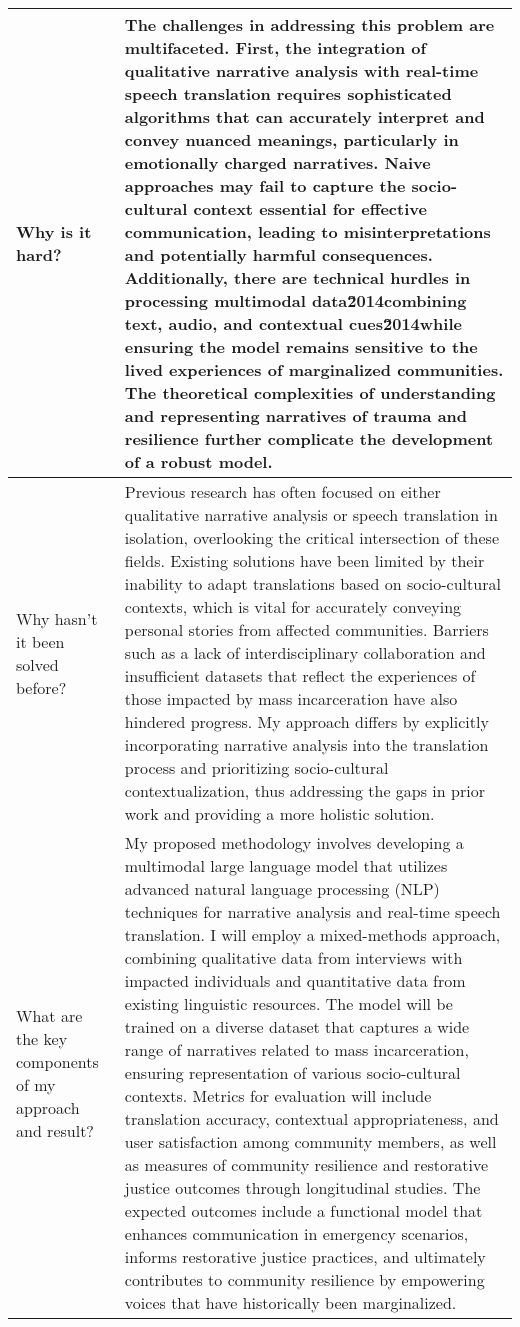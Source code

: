 \begin{table*}[htbp]
\begin{tabular}{p{3.5cm}p{12cm}}
\\ \midrule
Why is it hard? & 
The challenges in addressing this problem are multifaceted. First, the integration of qualitative narrative analysis with real-time speech translation requires sophisticated algorithms that can accurately interpret and convey nuanced meanings, particularly in emotionally charged narratives. Naive approaches may fail to capture the socio-cultural context essential for effective communication, leading to misinterpretations and potentially harmful consequences. Additionally, there are technical hurdles in processing multimodal data\u2014combining text, audio, and contextual cues\u2014while ensuring the model remains sensitive to the lived experiences of marginalized communities. The theoretical complexities of understanding and representing narratives of trauma and resilience further complicate the development of a robust model. \\ \midrule
Why hasn't it been solved before? & 
Previous research has often focused on either qualitative narrative analysis or speech translation in isolation, overlooking the critical intersection of these fields. Existing solutions have been limited by their inability to adapt translations based on socio-cultural contexts, which is vital for accurately conveying personal stories from affected communities. Barriers such as a lack of interdisciplinary collaboration and insufficient datasets that reflect the experiences of those impacted by mass incarceration have also hindered progress. My approach differs by explicitly incorporating narrative analysis into the translation process and prioritizing socio-cultural contextualization, thus addressing the gaps in prior work and providing a more holistic solution.\\ \midrule
What are the key components of my approach and result? & 
My proposed methodology involves developing a multimodal large language model that utilizes advanced natural language processing (NLP) techniques for narrative analysis and real-time speech translation. I will employ a mixed-methods approach, combining qualitative data from interviews with impacted individuals and quantitative data from existing linguistic resources. The model will be trained on a diverse dataset that captures a wide range of narratives related to mass incarceration, ensuring representation of various socio-cultural contexts. Metrics for evaluation will include translation accuracy, contextual appropriateness, and user satisfaction among community members, as well as measures of community resilience and restorative justice outcomes through longitudinal studies. The expected outcomes include a functional model that enhances communication in emergency scenarios, informs restorative justice practices, and ultimately contributes to community resilience by empowering voices that have historically been marginalized.\\ 

\end{tabular}
\end{table*}
